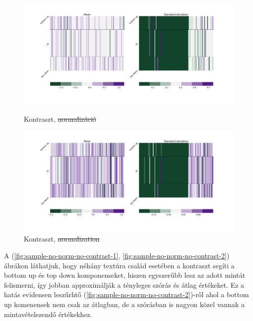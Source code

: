 \documentclass[12pt, english]{article}
\begin{document}
\begin{figure}[H]
\begin{minipage}{0.5\linewidth}
  \end{minipage}

  \begin{minipage}{0.5\linewidth}
    \centering
    \includegraphics[width=.75\linewidth]{z1_vis/z1_vis_contrast_no_norm/15_DenseLinLinLadderVAE_textures_noContrastNorm_contrast-stats-1_vector_comparisons_1.png} 
    \caption{Kontraszt, \st{normalizáció}}
    \label{fig:sample-no-norm-contrast-1}
  \end{minipage}
  \begin{minipage}{0.5\linewidth}
    \centering
    \includegraphics[width=.75\linewidth]{z1_vis/z1_vis_contrast_no_norm/15_DenseLinLinLadderVAE_textures_noContrastNorm_contrast-stats-2_vector_comparisons_1.png}
    \caption{Kontraszt, \st{normalization}}
    \label{fig:sample-no-norm-contrast-2}
  \end{minipage}
\end{figure}

\vspace{4mm}

\par A (\ref{fig:sample-no-norm-no-contrast-1}, \ref{fig:sample-no-norm-no-contrast-2}) ábrákon láthatjuk, hogy néhány textúra család esetében a kontraszt segíti a bottom up és top down komponenseket, hiszen egyszerűbb lesz az adott mintát felismerni, így jobban approximálják a tényleges szórás és átlag értékeket. Ez a hatás evidensen leszűrhtő (\ref{fig:sample-no-norm-no-contrast-2})-ről ahol a bottom up komenensek nem csak az átlagban, de a szórásban is nagyon közel vannak a mintavételezendő értékekhez.
\end{document}
